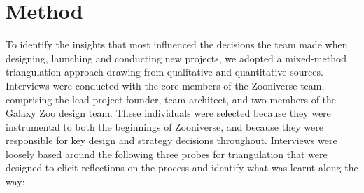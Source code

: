 \documentclass{sigchi}
\begin{document}

\section{Method}



To identify the insights that most influenced the decisions the team made when designing, launching and conducting new projects, we adopted a mixed-method triangulation approach \cite{olsen2004triangulation} drawing from qualitative and quantitative sources. Interviews were conducted with the core members of the Zooniverse team, comprising the lead project founder, team architect, and two members of the Galaxy Zoo design team.  These individuals were selected because they were instrumental to both the beginnings of Zooniverse, and because they were responsible for key design and strategy decisions throughout.  Interviews were loosely based around the following three probes for triangulation that were designed to elicit reflections on the process and identify what was learnt along the way:
\end{document}
